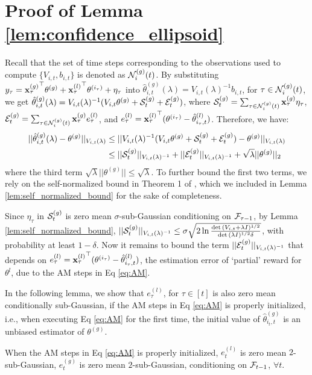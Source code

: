 \section{Proof of Lemma \ref{lem:confidence_ellipsoid}}
Recall that the set of time steps corresponding to the observations used to compute $\{V_{i,t},b_{i,t}\}$ is denoted as $\mathcal{N}^{(g)}_{i}(t)$.
By substituting $y_{\tau}={\mathbf{x}_{\tau}^{(g)}}^{\top}\theta^{(g)}+{\mathbf{x}_{\tau}^{(l)}}^{\top}\theta^{(i_{\tau})}+\eta_{\tau}$ into $\hat{\theta}^{(g)}_{i,t}(\lambda)=V_{i,t}(\lambda)^{-1}b_{i,t}$, for $\tau \in \mathcal{N}^{(g)}_{i}(t)$, we get $\hat{\theta}^{(g)}_{i,t}(\lambda)=V_{i,t}(\lambda)^{-1} ( V_{i,t} \theta^{(g)} + \mathcal{S}^{(g)}_{t} + \mathcal{E}^{(g)}_{t})$, where $\mathcal{S}^{(g)}_{t}=\sum_{\tau \in \mathcal{N}^{(g)}_{i}(t)}\mathbf{x}_{\tau}^{(g)}\eta_{\tau}$, $\mathcal{E}^{(g)}_{t}=\sum_{\tau \in \mathcal{N}^{(g)}_{i}(t)}\mathbf{x}_{\tau}^{(g)}e^{(l)}_{\tau}$, and $e^{(l)}_{\tau}={\mathbf{x}_{\tau}^{(l)}}^{\top}(\theta^{(i_{\tau})}-\hat{\theta}^{(l)}_{i_{\tau},t})$.
Therefore, we have:
\begin{equation*}
\begin{split}
     ||\hat{\theta}^{(g)}_{i,t}(\lambda) - \theta^{(g)}||_{V_{i,t}(\lambda)} & \leq ||V_{i,t}(\lambda)^{-1} ( V_{i,t} \theta^{(g)} + \mathcal{S}^{(g)}_{t} + \mathcal{E}^{(g)}_{t}) - \theta^{(g)}||_{V_{i,t}(\lambda)} \\
    & \leq ||\mathcal{S}^{(g)}_{t}||_{V_{i,t}(\lambda)^{-1}} + ||\mathcal{E}^{(g)}_{t}||_{V_{i,t}(\lambda)^{-1}} + \sqrt{\lambda} ||\theta^{(g)}||_{2}
\end{split}
\end{equation*}
where the third term $\sqrt{\lambda} ||\theta^{(g)}|| \leq \sqrt{\lambda}$.
To further bound the first two terms, we rely on the self-normalized bound in Theorem 1 of \cite{abbasi2011improved}, which we included in Lemma \ref{lem:self_normalized_bound} for the sake of completeness.

Since $\eta_{\tau}$ in $\mathcal{S}^{(g)}_{t}$ is zero mean $\sigma$-sub-Gaussian conditioning on $\mathcal{F}_{\tau-1}$, by Lemma \ref{lem:self_normalized_bound}, $||\mathcal{S}^{(g)}_{t}||_{V_{i,t}(\lambda)^{-1}} \leq \sigma \sqrt{2\ln{\frac{\det{(V_{i,t}+\lambda I)^{1/2}}}{\det{(\lambda I)^{1/2}}\delta}}}$, with probability at least $1-\delta$. Now it remains to bound the term $||\mathcal{E}^{(g)}_{t}||_{V_{i,t}(\lambda)^{-1}}$ that depends on $e^{(l)}_{\tau}={\mathbf{x}_{\tau}^{(l)}}^{\top}(\theta^{(i_{\tau})}-\hat{\theta}^{(l)}_{i_{\tau},t})$, the estimation error of `partial' reward for $\theta^{l}$, due to the AM steps in Eq \eqref{eq:AM}.

In the following lemma, we show that $e^{(l)}_{\tau}$, for $\tau \in [t]$ is also zero mean conditionally sub-Gaussian, if the AM steps in Eq \eqref{eq:AM} is properly initialized, i.e., when executing Eq \eqref{eq:AM} for the first time, the initial value of $\hat{\theta}_{i_{t},t}^{(g)}$ is an unbiased estimator of $\theta^{(g)}$.
\begin{lemma}\label{lem:e_subgaussian}
When the AM steps in Eq \eqref{eq:AM} is properly initialized, $e^{(l)}_{t}$ is zero mean $2$-sub-Gaussian, $e^{(g)}_{t}$ is zero mean $2$-sub-Gaussian, conditioning on $\mathcal{F}_{t-1}$, $\forall t$.
\end{lemma}

